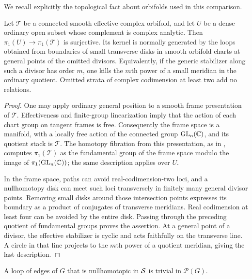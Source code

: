 We recall explicitly the topological fact about orbifolds used in
this comparison.

\begin{lemma}\label{app:orbifold-meridians}
Let $\mathcal T$ be a connected smooth effective complex orbifold, and
let $U$ be a dense ordinary open subset whose complement is complex
analytic.  Then $\pi_1(U)\to\pi_1(\mathcal T)$ is surjective.  Its
kernel is normally generated by the loops obtained from boundaries
of small transverse disks in smooth orbifold charts at general
points of the omitted divisors.  Equivalently, if the generic
stabilizer along such a divisor has order $m$, one kills the $m$th
power of a small meridian in the ordinary quotient.  Omitted strata
of complex codimension at least two add no relations.
\end{lemma}

\begin{proof}
One may apply ordinary general position to a smooth frame
presentation of $\mathcal T$.  Effectiveness and finite-group
linearization imply that the action of each chart group on tangent
frames is free.  Consequently the frame space is a manifold, with a
locally free action of the connected group $\operatorname{GL}_n(\mathbb C)$,
and its quotient stack is $\mathcal T$.  The homotopy fibration from
this presentation, as in \cite[Example~5.6]{Noohi2014}, computes $\pi_1(\mathcal T)$ as the fundamental
group of the frame space modulo the image of
$\pi_1(\operatorname{GL}_n(\mathbb C))$; the same description applies over
$U$.

In the frame space, paths can avoid real-codimension-two loci, and a
nullhomotopy disk can meet such loci transversely in finitely many
general divisor points.  Removing small disks around those
intersection points expresses its boundary as a product of
conjugates of transverse meridians.  Real codimension at least four
can be avoided by the entire disk.  Passing through the preceding
quotient of fundamental groups proves the assertion.  At a general
point of a divisor, the effective stabilizer is cyclic and acts
faithfully on the transverse line.  A circle in that line projects
to the $m$th power of a quotient meridian, giving the last description.
\end{proof}

\begin{lemma}\label{app:true-relations}
A loop of edges of $G$ that is nullhomotopic in $\mathcal S$ is trivial in
$\mathcal P(G)$.
\end{lemma}

